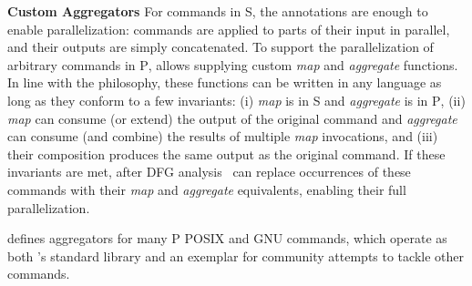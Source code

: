 \documentclass[letterpaper,twocolumn,10pt]{article}
\newcommand{\heading}[1]{\vspace{4pt}\noindent\textbf{#1}\enspace}
\newcommand{\cn}[1]{\mbox{\textcircled{\footnotesize #1}}}
\newcommand{\sta}{\cn{\textsc{S}}\xspace}
\newcommand{\pur}{\cn{\textsc{P}}\xspace}
\newcommand{\nv}[1]{[{\color{cyan}nv: #1}]}
\newcommand{\kk}[1]{[{\color{magenta}kk: #1}]}
\newcommand{\tr}[1]{} %
\begin{document}
\heading{Custom Aggregators}
For commands in \sta, the annotations are enough to enable parallelization:
  commands are applied to parts of their input in parallel, and their outputs are simply concatenated.
%
To support the parallelization of arbitrary commands in \pur, \sys allows supplying custom \emph{map} and \emph{aggregate} functions.
In line with the \unix philosophy, these functions can be written in any language as long as they conform to a few invariants:
  (i) \emph{map} is in \sta and \emph{aggregate} is in \pur,
  (ii) \emph{map} can consume (or extend) the output of the original command and  \emph{aggregate} can consume (and combine) the results of multiple \emph{map} invocations, and
  (iii) their composition produces the same output as the original command.
If these invariants are met, after DFG analysis~ \sys can replace occurrences of these commands with their \emph{map} and \emph{aggregate} equivalents, enabling their full parallelization.

\sys defines aggregators for many \pur POSIX and GNU commands, which operate as both \sys's standard library and an exemplar for community attempts to tackle other commands.


\tr{\kk{I am not sure a general interface is so easy to design. It needs
  more though. It might be beneficial to just talk about sort and wc
  here and how we implemented them and nothing more. Or maybe this
  could then go to the implementation? Or maybe say that one can write
  a python function that given a node of the graph, transforms it into
  many. I am not sure what is best...}}


\tr{Can we find a solution for the commands in coreutils?}
\end{document}
